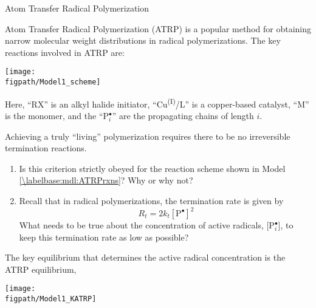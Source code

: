 \begin{activity}{Atom Transfer Radical Polymerization}
\begin{instructornotes}
\end{instructornotes}


\begin{model}
	\label{\labelbase:mdl:ATRPrxns}

	Atom Transfer Radical Polymerization (ATRP) is a popular method for obtaining narrow molecular weight distributions in radical polymerizations.  The key reactions involved in ATRP are:
	
	\centerline{\texttt{[image: \\figpath/Model1\_scheme]}}
	
	Here, ``RX'' is an alkyl halide initiator, ``Cu\textsuperscript{(I)}/L'' is a copper-based catalyst, ``M'' is the monomer, and the ``P$_i^\bullet$'' are the propagating chains of length $i$.
	
\end{model}


\begin{ctqs}

	\question Achieving a truly ``living'' polymerization requires there to be no irreversible termination reactions.
	
		\begin{enumerate}
		
			\item Is this criterion strictly obeyed for the reaction scheme shown in Model \ref{\labelbase:mdl:ATRPrxns}?  Why or why not?  \label{\labelbase:ctq:terminationsuprression}
			
				\begin{solution}[1in]
				\end{solution}
			
			\item Recall that in radical polymerizations, the termination rate is given by
				\begin{equation*}\
					R_t = 2k_t[\text{P}^\bullet]^2
				\end{equation*}
				What needs to be true about the concentration of active radicals, [P$_i^\bullet$], to keep this termination rate as low as possible?
				
				\begin{solution}[1in]
				\end{solution}
			
		\end{enumerate}
	
	\question The key equilibrium that determines the active radical concentration is the ATRP equilibrium,
	
	\centerline{\texttt{[image: \\figpath/Model1\_KATRP]}}
		

\end{ctqs}
\end{activity}

